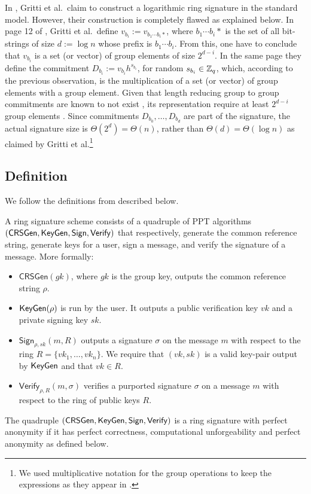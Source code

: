 In \cite{IET:GriSusPla16}, Gritti et al.~claim to construct a logarithmic ring signature in the standard model. However, their construction is completely flawed as explained below. 
In page 12 of \cite{IET:GriSusPla16}, Gritti et al.~define $v_{b_i} := v_{b_1\cdots b_i *}$, where $b_1\cdots b_i *$ is the set of all bit-strings of size $d:=\log n$ whose prefix is $b_1\cdots b_i$. From this, one have to conclude that $v_{b_i}$ is a set (or vector) of group elements of size $2^{d-i}$.
In the same page they define the commitment $D_{b_i} := v_{b_i}h^{s_{b_i}}$, for random $s_{b_i}\in\mathbb{Z}_q$, which, according to the previous observation, is the multiplication of a set (or vector) of group elements with a group element. Given that length reducing group to group commitments are known to not exist \cite{EC:AbeHarOhk12}, its representation require at least $2^{d-i}$ group elements . Since commitments $D_{b_0},\ldots,D_{b_d}$ are part of the signature, the actual signature size is $\Theta(2^d)=\Theta(n)$, rather than  $\Theta(d)=\Theta(\log n)$ as claimed by Gritti et al.\footnote{We used multiplicative notation for the group operations to keep the expressions as they appear in \cite{IET:GriSusPla16}.}

\subsection{Definition}
We follow the definitions from \cite{ICALP:ChaGroSah07} described below.

\begin{definition}
A ring signature scheme consists of a quadruple of
PPT algorithms $(\mathsf{CRSGen}, \mathsf{KeyGen}, \mathsf{Sign}, \mathsf{Verify})$ that respectively, generate the common
reference string, generate keys for a user, sign a message, and verify the signature of a
message. More formally:
\begin{itemize}
\item $\mathsf{CRSGen}(gk)$, where $gk$ is the group key, outputs the common reference
string $\rho$.
\item $\mathsf{KeyGen}(\rho)$ is run by the user. It outputs a public verification key $vk$ and a private
signing key $sk$.
\item $\mathsf{Sign}_{\rho,sk}(m, R)$ outputs a signature $\sigma$ on the message $m$ with respect to the ring
$R = \{vk_1,\ldots,vk_n\}$. We require that $(vk, sk)$ is a valid key-pair output by $\mathsf{KeyGen}$
and that $vk \in R$.
\item $\mathsf{Verify}_{\rho,R}(m, \sigma)$ verifies a purported signature $\sigma$ on a message $m$ with respect to
the ring of public keys $R$.
\end{itemize}
The quadruple $(\mathsf{CRSGen}, \mathsf{KeyGen}, \mathsf{Sign}, \mathsf{Verify})$ is a ring signature with perfect
anonymity if it has perfect correctness, computational unforgeability and perfect
anonymity as defined below.
\end{definition}

